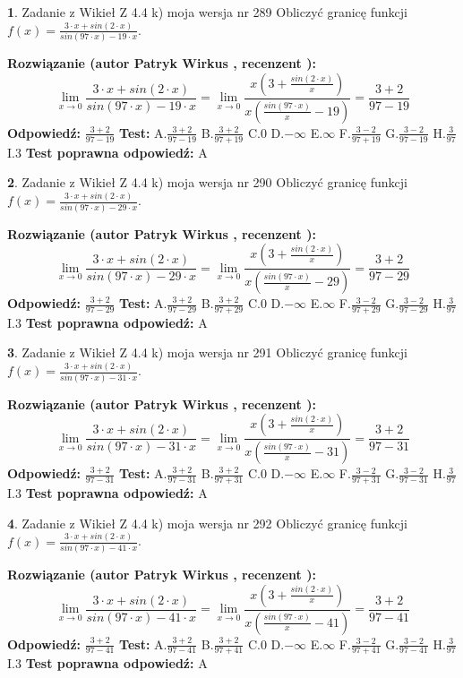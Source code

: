 \documentclass[12pt, a4paper]{article}
\theoremstyle{definition} %
\newtheorem{zad}{}
\newcommand{\zadStart}[1]{\begin{zad}#1\newline}
\newcommand{\zadStop}{\end{zad}}
\newcommand{\rozwStart}[2]{\noindent \textbf{Rozwiązanie (autor #1 , recenzent #2): }\newline}
\newcommand{\rozwStop}{\newline}
\newcommand{\odpStart}{\noindent \textbf{Odpowiedź:}\newline}
\newcommand{\odpStop}{\newline}
\newcommand{\testStart}{\noindent \textbf{Test:}\newline}
\newcommand{\testStop}{\newline}
\newcommand{\kluczStart}{\noindent \textbf{Test poprawna odpowiedź:}\newline}
\newcommand{\kluczStop}{\newline}
\begin{document}
\zadStart{Zadanie z Wikieł Z 4.4 k) moja wersja nr 289}
Obliczyć granicę funkcji $f(x)=\frac{3\cdot x +sin(2\cdot x)}{sin(97\cdot x) -19\cdot x}$.
\zadStop
\rozwStart{Patryk Wirkus}{}
$$\lim\limits_{x\to 0}\frac{3\cdot x +sin(2\cdot x)}{sin(97\cdot x) -19\cdot x}
=\lim\limits_{x\to 0}\frac{x(3+\frac{sin(2\cdot x)}{x})}{x(\frac{sin(97\cdot x)}{x}-19)}
=\frac{3+2}{97-19}$$
\rozwStop
\odpStart
$\frac{3+2}{97-19}$
\odpStop
\testStart
A.$\frac{3+2}{97-19}$
B.$\frac{3+2}{97+19}$
C.$0$
D.$-\infty$
E.$\infty$
F.$\frac{3-2}{97+19}$
G.$\frac{3-2}{97-19}$
H.$\frac{3}{97}$
I.$3$
\testStop
\kluczStart
A
\kluczStop



\zadStart{Zadanie z Wikieł Z 4.4 k) moja wersja nr 290}
Obliczyć granicę funkcji $f(x)=\frac{3\cdot x +sin(2\cdot x)}{sin(97\cdot x) -29\cdot x}$.
\zadStop
\rozwStart{Patryk Wirkus}{}
$$\lim\limits_{x\to 0}\frac{3\cdot x +sin(2\cdot x)}{sin(97\cdot x) -29\cdot x}
=\lim\limits_{x\to 0}\frac{x(3+\frac{sin(2\cdot x)}{x})}{x(\frac{sin(97\cdot x)}{x}-29)}
=\frac{3+2}{97-29}$$
\rozwStop
\odpStart
$\frac{3+2}{97-29}$
\odpStop
\testStart
A.$\frac{3+2}{97-29}$
B.$\frac{3+2}{97+29}$
C.$0$
D.$-\infty$
E.$\infty$
F.$\frac{3-2}{97+29}$
G.$\frac{3-2}{97-29}$
H.$\frac{3}{97}$
I.$3$
\testStop
\kluczStart
A
\kluczStop



\zadStart{Zadanie z Wikieł Z 4.4 k) moja wersja nr 291}
Obliczyć granicę funkcji $f(x)=\frac{3\cdot x +sin(2\cdot x)}{sin(97\cdot x) -31\cdot x}$.
\zadStop
\rozwStart{Patryk Wirkus}{}
$$\lim\limits_{x\to 0}\frac{3\cdot x +sin(2\cdot x)}{sin(97\cdot x) -31\cdot x}
=\lim\limits_{x\to 0}\frac{x(3+\frac{sin(2\cdot x)}{x})}{x(\frac{sin(97\cdot x)}{x}-31)}
=\frac{3+2}{97-31}$$
\rozwStop
\odpStart
$\frac{3+2}{97-31}$
\odpStop
\testStart
A.$\frac{3+2}{97-31}$
B.$\frac{3+2}{97+31}$
C.$0$
D.$-\infty$
E.$\infty$
F.$\frac{3-2}{97+31}$
G.$\frac{3-2}{97-31}$
H.$\frac{3}{97}$
I.$3$
\testStop
\kluczStart
A
\kluczStop



\zadStart{Zadanie z Wikieł Z 4.4 k) moja wersja nr 292}
Obliczyć granicę funkcji $f(x)=\frac{3\cdot x +sin(2\cdot x)}{sin(97\cdot x) -41\cdot x}$.
\zadStop
\rozwStart{Patryk Wirkus}{}
$$\lim\limits_{x\to 0}\frac{3\cdot x +sin(2\cdot x)}{sin(97\cdot x) -41\cdot x}
=\lim\limits_{x\to 0}\frac{x(3+\frac{sin(2\cdot x)}{x})}{x(\frac{sin(97\cdot x)}{x}-41)}
=\frac{3+2}{97-41}$$
\rozwStop
\odpStart
$\frac{3+2}{97-41}$
\odpStop
\testStart
A.$\frac{3+2}{97-41}$
B.$\frac{3+2}{97+41}$
C.$0$
D.$-\infty$
E.$\infty$
F.$\frac{3-2}{97+41}$
G.$\frac{3-2}{97-41}$
H.$\frac{3}{97}$
I.$3$
\testStop
\kluczStart
A
\kluczStop
\end{document}
